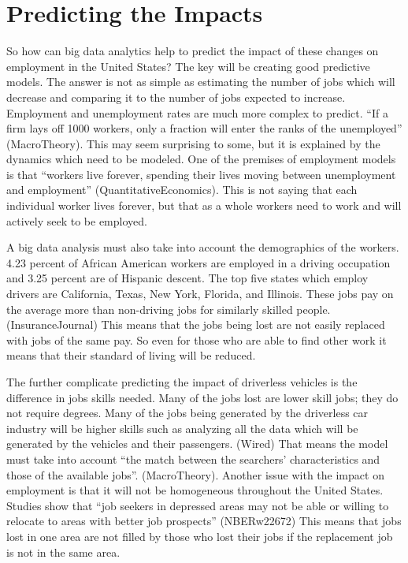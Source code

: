 \documentclass[sigconf]{acmart}
\begin{document}
\section{Predicting the Impacts}

So how can big data analytics help to predict the impact of these changes on 
employment in the United States?  The key will be creating good predictive 
models.  The answer is not as simple as estimating the number of jobs which 
will decrease and comparing it to the number of jobs expected to increase.  
Employment and unemployment rates are much more complex to predict.  ``If a 
firm lays off 1000 workers, only a fraction will enter the ranks of the 
unemployed'' (MacroTheory).  This may seem surprising to some, but it is 
explained by the dynamics which need to be modeled.  One of the premises 
of employment models is that ``workers live forever, spending their lives 
moving between unemployment and employment'' (QuantitativeEconomics).  This 
is not saying that each individual worker lives forever, but that as a whole 
workers need to work and will actively seek to be employed.  

A big data analysis must also take into account the demographics of the 
workers.  4.23 percent of African American workers are employed in a driving 
occupation and 3.25 percent are of Hispanic descent.  The top five states 
which employ drivers are California, Texas, New York, Florida, and Illinois.  
These jobs pay on the average more than non-driving jobs for similarly 
skilled people.  (InsuranceJournal)  This means that the jobs being lost are 
not easily replaced with jobs of the same pay.  So even for those who are 
able to find other work it means that their standard of living will be 
reduced.  

The further complicate predicting the impact of driverless vehicles is the 
difference in jobs skills needed.  Many of the jobs lost are lower skill jobs; 
they do not require degrees.  Many of the jobs being generated by the 
driverless car industry will be higher skills such as analyzing all the data 
which will be generated by the vehicles and their passengers.  (Wired)  That 
means the model must take into account ``the match between the searchers' 
characteristics and those of the available jobs''.  (MacroTheory).  Another 
issue with the impact on employment is that it will not be homogeneous 
throughout the United States.  Studies show that ``job seekers in depressed 
areas may not be able or willing to relocate to areas with better job 
prospects'' (NBERw22672)  This means that jobs lost in one area are not 
filled by those who lost their jobs if the replacement job is not in the 
same area.  
\end{document}
